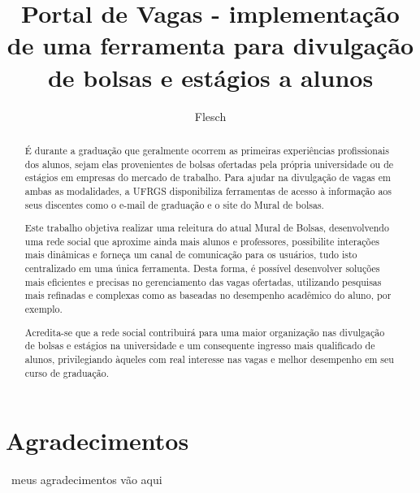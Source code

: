 \documentclass[cic,tc]{iiufrgs}
\title{Portal de Vagas - implementação de uma ferramenta para divulgação de bolsas e estágios a alunos}
\author{Flesch}{Jean Ampos}
\begin{document}
\maketitle


\chapter*{Agradecimentos}
~meus agradecimentos vão aqui~



\begin{abstract}
	É durante a graduação que geralmente ocorrem as primeiras experiências profissionais dos alunos, sejam elas provenientes de bolsas ofertadas pela própria universidade ou de estágios em empresas do mercado de trabalho. Para ajudar na divulgação de vagas em ambas as modalidades, a UFRGS disponibiliza ferramentas de acesso à informação aos seus discentes como o e-mail de graduação e o site do Mural de bolsas.
    
    Este  trabalho  objetiva realizar  uma  releitura  do atual Mural  de  Bolsas, desenvolvendo  uma rede social que aproxime ainda mais alunos e professores, possibilite interações mais dinâmicas e forneça um canal de comunicação para os usuários, tudo isto centralizado em uma única ferramenta. Desta forma, é possível desenvolver soluções mais eficientes e precisas no gerenciamento das vagas ofertadas, utilizando pesquisas mais refinadas e complexas como as baseadas no desempenho acadêmico do aluno, por exemplo.
    
    Acredita-se que a rede social contribuirá para uma maior organização nas divulgação de bolsas e estágios na universidade e um consequente ingresso mais qualificado de alunos, privilegiando àqueles com real interesse nas vagas e melhor desempenho em seu curso de graduação.
    \newline
\end{abstract}
\end{document}
